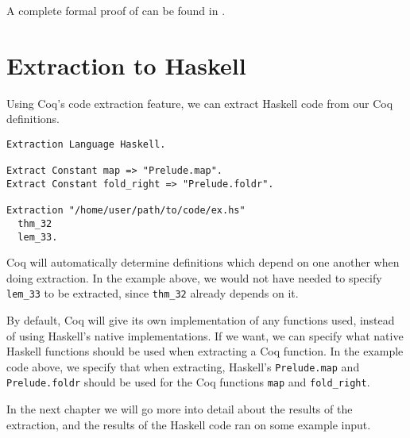 A complete formal proof of  can be found in .

\section{Extraction to Haskell}

Using Coq's code extraction feature, we can extract Haskell code from our Coq definitions.

\begin{minipage}{\linewidth}
\begin{lstlisting}[language=Coq, label={lst:extraction}, caption={Extraction of Coq definitions to Haskell}]
Extraction Language Haskell.

Extract Constant map => "Prelude.map".
Extract Constant fold_right => "Prelude.foldr".

Extraction "/home/user/path/to/code/ex.hs"
  thm_32
  lem_33.
\end{lstlisting}
\end{minipage}

Coq will automatically determine definitions which depend on one another when doing extraction.
In the example above, we would not have needed to specify \lstinline{lem_33} to be extracted,
since \lstinline{thm_32} already depends on it.

By default, Coq will give its own implementation of any functions used, instead of using
Haskell's native implementations. If we want, we can specify what native Haskell functions
should be used when extracting a Coq function. In the example code above,
we specify that when extracting, Haskell's \lstinline[language=Haskell]{Prelude.map} and \lstinline[language=Haskell]{Prelude.foldr}
should be used for the Coq functions \lstinline{map} and \lstinline{fold_right}.

In the next chapter we will go more into detail about the results of the extraction,
and the results of the Haskell code ran on some example input.
